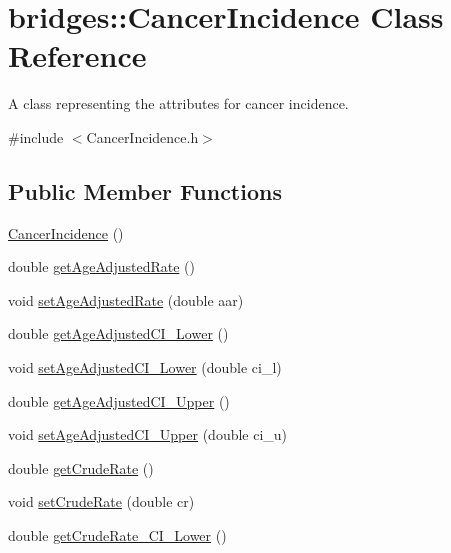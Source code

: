 \hypertarget{classbridges_1_1_cancer_incidence}{}\section{bridges\+:\+:Cancer\+Incidence Class Reference}
\label{classbridges_1_1_cancer_incidence}


A class representing the attributes for cancer incidence.  




{\ttfamily \#include $<$Cancer\+Incidence.\+h$>$}

\subsection*{Public Member Functions}
\begin{DoxyCompactItemize}
\item 
\mbox{\hyperlink{classbridges_1_1_cancer_incidence_a3f5bb34394a22169bb4465c07e50fba1}{Cancer\+Incidence}} ()
\item 
double \mbox{\hyperlink{classbridges_1_1_cancer_incidence_ad06ff27e2ba806ec4e3b10873a0f2588}{get\+Age\+Adjusted\+Rate}} ()
\item 
void \mbox{\hyperlink{classbridges_1_1_cancer_incidence_a607a50050fdfb75a737a684096046abf}{set\+Age\+Adjusted\+Rate}} (double aar)
\item 
double \mbox{\hyperlink{classbridges_1_1_cancer_incidence_a0bd92ed98f66ea10242e7c7d5d6a4af8}{get\+Age\+Adjusted\+C\+I\+\_\+\+Lower}} ()
\item 
void \mbox{\hyperlink{classbridges_1_1_cancer_incidence_abc134f9f2c6d2be070ac8af502cfc10d}{set\+Age\+Adjusted\+C\+I\+\_\+\+Lower}} (double ci\+\_\+l)
\item 
double \mbox{\hyperlink{classbridges_1_1_cancer_incidence_a0dbf29bfbba38c580cbdc881d24ed603}{get\+Age\+Adjusted\+C\+I\+\_\+\+Upper}} ()
\item 
void \mbox{\hyperlink{classbridges_1_1_cancer_incidence_abd120d1ca536223aa41f25de79eef31d}{set\+Age\+Adjusted\+C\+I\+\_\+\+Upper}} (double ci\+\_\+u)
\item 
double \mbox{\hyperlink{classbridges_1_1_cancer_incidence_af1c4cb6e6a8df232a0ed0406b7069439}{get\+Crude\+Rate}} ()
\item 
void \mbox{\hyperlink{classbridges_1_1_cancer_incidence_af7b204185967ae857ef6fae9c0f70450}{set\+Crude\+Rate}} (double cr)
\item 
double \mbox{\hyperlink{classbridges_1_1_cancer_incidence_aa83622c58d8cbfee9ca85131cac41f84}{get\+Crude\+Rate\+\_\+\+C\+I\+\_\+\+Lower}} ()

\end{DoxyCompactItemize}
